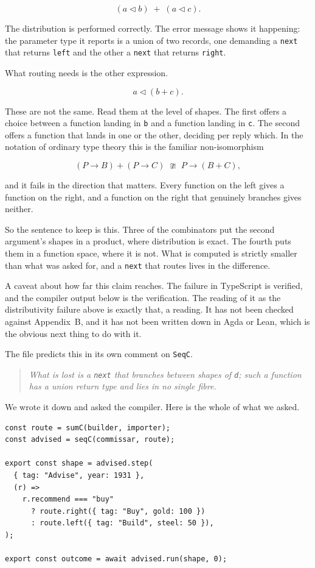 \documentclass[11pt,a4paper]{article}
\begin{document}
\[ (a \lhd b) \;+\; (a \lhd c). \]

The distribution is performed correctly. The error message shows it happening: the parameter
type it reports is a union of two records, one demanding a \texttt{next} that returns
\texttt{left} and the other a \texttt{next} that returns \texttt{right}.

What routing needs is the other expression.

\[ a \lhd (b + c). \]

These are not the same. Read them at the level of shapes. The first offers a choice between a
function landing in \texttt{b} and a function landing in \texttt{c}. The second offers a
function that lands in one or the other, deciding per reply which. In the notation of ordinary
type theory this is the familiar non-isomorphism

\[ (P \to B) + (P \to C) \;\ncong\; P \to (B + C), \]

and it fails in the direction that matters. Every function on the left gives a function on the
right, and a function on the right that genuinely branches gives neither.

So the sentence to keep is this. Three of the combinators put the second argument's shapes in a
product, where distribution is exact. The fourth puts them in a function space, where it is
not. What is computed is strictly smaller than what was asked for, and a \texttt{next} that
routes lives in the difference.

A caveat about how far this claim reaches. The failure in TypeScript is verified, and the
compiler output below is the verification. The reading of it as the distributivity failure
above is exactly that, a reading. It has not been checked against Appendix~B, and it has not
been written down in Agda or Lean, which is the obvious next thing to do with it.

The file predicts this in its own comment on \texttt{SeqC}.

\begin{quote}
\emph{What is lost is a \texttt{next} that branches between shapes of \texttt{d}; such a
function has a union return type and lies in no single fibre.}
\end{quote}

We wrote it down and asked the compiler. Here is the whole of what we asked.

\begin{lstlisting}[language=TS]
const route = sumC(builder, importer);
const advised = seqC(commissar, route);

export const shape = advised.step(
  { tag: "Advise", year: 1931 },
  (r) =>
    r.recommend === "buy"
      ? route.right({ tag: "Buy", gold: 100 })
      : route.left({ tag: "Build", steel: 50 }),
);

export const outcome = await advised.run(shape, 0);
\end{lstlisting}
\end{document}
